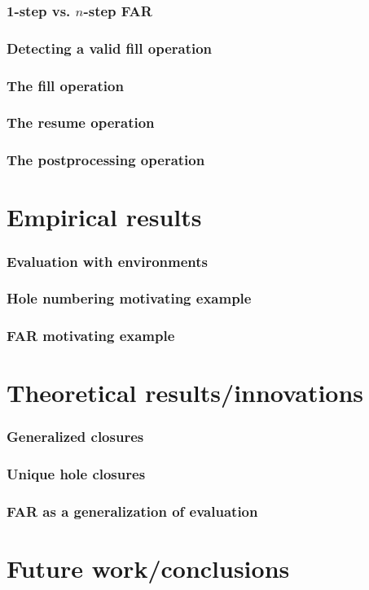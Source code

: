 \documentclass{beamer}
\begin{document}
\begin{frame}
  \frametitle{1-step vs. $n$-step FAR}
\end{frame}

\begin{frame}
  \frametitle{Detecting a valid fill operation}
\end{frame}

\begin{frame}
  \frametitle{The fill operation}
\end{frame}

\begin{frame}
  \frametitle{The resume operation}
\end{frame}

\begin{frame}
  \frametitle{The postprocessing operation}
\end{frame}

\section{Empirical results}

\begin{frame}
  \frametitle{Evaluation with environments}
\end{frame}

\begin{frame}
  \frametitle{Hole numbering motivating example}
\end{frame}

\begin{frame}
  \frametitle{FAR motivating example}
\end{frame}

\section{Theoretical results/innovations}

\begin{frame}
  \frametitle{Generalized closures}
\end{frame}

\begin{frame}
  \frametitle{Unique hole closures}
\end{frame}

\begin{frame}
  \frametitle{FAR as a generalization of evaluation}
\end{frame}

\section{Future work/conclusions}
\end{document}
